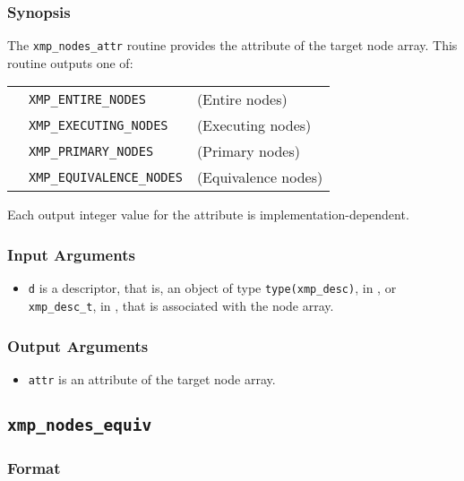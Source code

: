 \subsubsection*{Synopsis}

The {\tt xmp\_nodes\_attr} routine provides the attribute of the target node array. This routine outputs one of:

\begin{tabular}{lll}
  \hspace{2.5cm} & {\tt XMP\_ENTIRE\_NODES} & (Entire nodes)\\
                 & {\tt XMP\_EXECUTING\_NODES}  & (Executing nodes) \\
                 & {\tt XMP\_PRIMARY\_NODES} & (Primary nodes) \\
                 & {\tt XMP\_EQUIVALENCE\_NODES} & (Equivalence nodes) \\
\end{tabular}

  Each output integer value for the attribute is implementation-dependent.

\subsubsection*{Input Arguments}
\begin{itemize}
 \item {\tt d} is a descriptor, that is, an object of type 
       {\tt type(xmp\_desc)}, in {\XMPF}, or {\tt xmp\_desc\_t},
       in {\XMPC}, that is associated with the node array.
\end{itemize}

\subsubsection*{Output Arguments}
\begin{itemize}
 \item {\tt attr} is an attribute of the target node array.
\end{itemize}


\subsection{\tt xmp\_nodes\_equiv}

\subsubsection*{Format}

